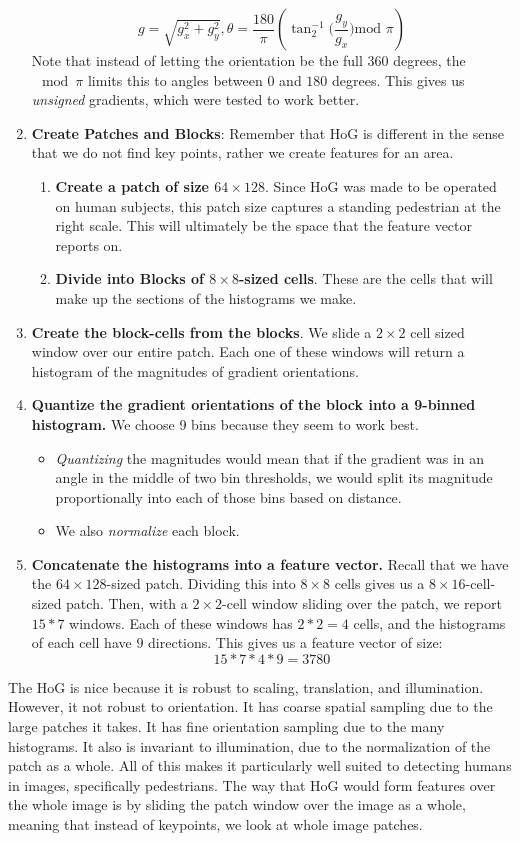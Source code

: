 \documentclass{article}
\begin{document}
\begin{enumerate}
    $$g = \sqrt{g_x^2 + g_y^2}, \theta = \frac{180}{\pi}(\tan_2^{-1}\bigg(\frac{g_y}{g_x}\bigg)\text{mod }\pi)$$
    Note that instead of letting the orientation be the full $360$ degrees, the $\mod{\pi}$ limits this to angles between $0$ and $180$ degrees. This gives us \textit{unsigned} gradients, which were tested to work better.
    \item \textbf{Create Patches and Blocks}: Remember that HoG is different in the sense that we do not find key points, rather we create features for an area. \begin{enumerate}
        \item \textbf{Create a patch of size $64 \times 128$}. Since HoG was made to be operated on human subjects, this patch size captures a standing pedestrian at the right scale. This will ultimately be the space that the feature vector reports on.
        \item \textbf{Divide into Blocks of $8 \times 8$-sized cells}. These are the cells that will make up the sections of the histograms we make. 
    \end{enumerate}
    \item \textbf{Create the block-cells from the blocks}. We slide a $2 \times 2$ cell sized window over our entire patch. Each one of these windows will return  a histogram of the magnitudes of gradient orientations.
    \item \textbf{Quantize the gradient orientations of the block into a 9-binned histogram.} We choose 9 bins because they seem to work best.
    \begin{itemize}
        \item \textit{Quantizing} the magnitudes would mean that if the gradient was in an angle in the middle of two bin thresholds, we would split its magnitude proportionally into each of those bins based on distance. 
        \item We also \textit{normalize} each block. 
    \end{itemize}
    \item \textbf{Concatenate the histograms into a feature vector.} Recall that we have the $64 \times 128$-sized patch. Dividing this into $8\times 8$ cells gives us a $8\times 16$-cell-sized patch. Then, with a $2\times2$-cell window sliding over the patch, we report $15 * 7$ windows. Each of these windows has $2*2 = 4$ cells, and the histograms of each cell have $9$ directions. This gives us a feature vector of size:
    $$15 * 7 * 4 * 9 = 3780$$
\end{enumerate}
The HoG is nice because it is robust to scaling, translation, and illumination. However, it not robust to orientation. It has coarse spatial sampling due to the large patches it takes. It has fine orientation sampling due to the many histograms. It also is invariant to illumination, due to the normalization of the patch as a whole. All of this makes it particularly well suited to detecting humans in images, specifically pedestrians. The way that HoG would form features over the whole image is by sliding the patch window over the image as a whole, meaning that instead of keypoints, we look at whole image patches.
\end{document}
